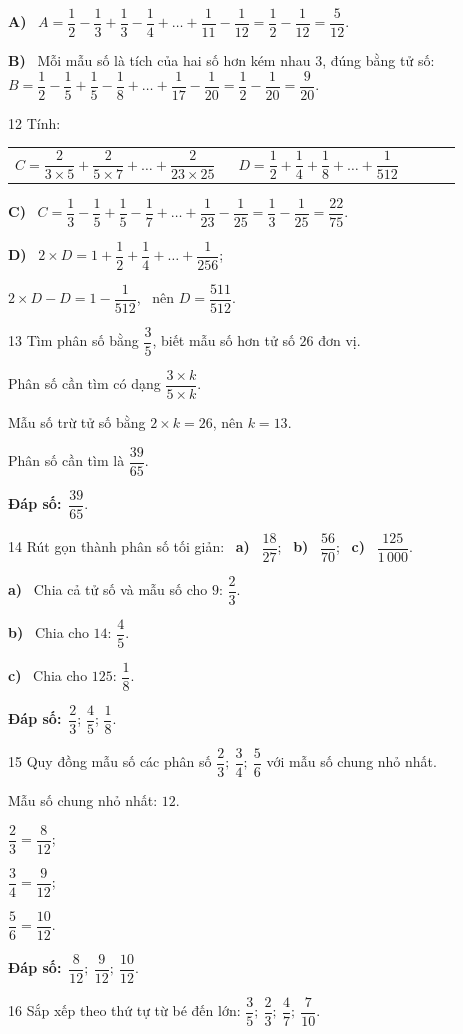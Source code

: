 \documentclass[11pt]{article}
\makeatletter
\newif\ifsol \solfalse
\renewcommand{\arraystretch}{1.35}
\providecommand{\AnsWord}{Đáp số}
\newcommand{\dapso}[1]{\par\textbf{\AnsWord:}\ #1}
\newcommand{\probsol}[1]{%
  \begin{lrbox}{\solmeasure}\begin{minipage}{\dimexpr\linewidth-24pt\relax}#1\end{minipage}\end{lrbox}%
  \ifsol
    \begin{solbox}#1\end{solbox}%
  \else
    \setlength{\solht}{\dimexpr\ht\solmeasure+\dp\solmeasure+0.85cm\relax}%
    \ifdim\solht<1.35cm\setlength{\solht}{1.35cm}\fi
    \begin{tcolorbox}[colback=white,colframe=Line,boxrule=0.8pt,arc=5pt,
      left=8pt,right=8pt,top=4pt,bottom=4pt,height=\solht]{\footnotesize\color{Slate}\itshape\WorkWord}\end{tcolorbox}%
  \fi}
\newcommand{\pa}[1]{\textbf{#1)}\ }
\newenvironment{cols2}{\par\vspace{3pt}\noindent\setlength{\tabcolsep}{0pt}\renewcommand{\arraystretch}{1.3}%
  \begin{tabular}{@{}>{\raggedright\arraybackslash\rule{0pt}{4.4ex}}p{0.48\linewidth}<{\rule[-2.3ex]{0pt}{0pt}}@{\hspace{0.03\linewidth}}>{\raggedright\arraybackslash\rule{0pt}{4.4ex}}p{0.48\linewidth}<{\rule[-2.3ex]{0pt}{0pt}}@{}}}%
  {\end{tabular}\par}
\newcommand{\gap}{\vspace{0.3cm}}
\def\WorkWord{Bài làm:}
\def\AnsWord{Đáp số}
\makeatother
\begin{document}
\probsol{
\pa{A} $A=\dfrac12-\dfrac13+\dfrac13-\dfrac14+\dots+\dfrac1{11}-\dfrac1{12}=\dfrac12-\dfrac1{12}=\dfrac5{12}$.\par
\pa{B} Mỗi mẫu số là tích của hai số hơn kém nhau $3$, đúng bằng tử số: $B=\dfrac12-\dfrac15+\dfrac15-\dfrac18+\dots+\dfrac1{17}-\dfrac1{20}=\dfrac12-\dfrac1{20}=\dfrac9{20}$.
}
\gap
\begin{probbox}{12}{\relax}
Tính:
\begin{cols2}
$C=\dfrac2{3\times5}+\dfrac2{5\times7}+\dots+\dfrac2{23\times25}$ & $D=\dfrac12+\dfrac14+\dfrac18+\dots+\dfrac1{512}$
\end{cols2}
\end{probbox}
\probsol{
\pa{C} $C=\dfrac13-\dfrac15+\dfrac15-\dfrac17+\dots+\dfrac1{23}-\dfrac1{25}=\dfrac13-\dfrac1{25}=\dfrac{22}{75}$.\par
\pa{D} $2\times D=1+\dfrac12+\dfrac14+\dots+\dfrac1{256}$;\par $2\times D-D=1-\dfrac1{512}$, \ nên $D=\dfrac{511}{512}$.
}
\gap
\begin{probbox}{13}{\relax}
Tìm phân số bằng $\dfrac35$, biết mẫu số hơn tử số $26$ đơn vị.
\end{probbox}
\probsol{
Phân số cần tìm có dạng $\dfrac{3\times k}{5\times k}$.\par Mẫu số trừ tử số bằng $2\times k=26$, nên $k=13$.\par
Phân số cần tìm là $\dfrac{39}{65}$.
\dapso{$\dfrac{39}{65}$.}}
\gap
\begin{probbox}{14}{\relax}
Rút gọn thành phân số tối giản: \ \pa{a} $\dfrac{18}{27}$; \ \pa{b} $\dfrac{56}{70}$; \ \pa{c} $\dfrac{125}{1\,000}$.
\end{probbox}
\probsol{
\pa{a} Chia cả tử số và mẫu số cho $9$: $\dfrac23$.\par \pa{b} Chia cho $14$: $\dfrac45$.\par \pa{c} Chia cho $125$: $\dfrac18$.
\dapso{$\dfrac23$; $\dfrac45$; $\dfrac18$.}}
\gap
\begin{probbox}{15}{\relax}
Quy đồng mẫu số các phân số $\dfrac23;\ \dfrac34;\ \dfrac56$ với mẫu số chung nhỏ nhất.
\end{probbox}
\probsol{
Mẫu số chung nhỏ nhất: $12$.\par $\dfrac23=\dfrac8{12}$;\par $\dfrac34=\dfrac9{12}$;\par $\dfrac56=\dfrac{10}{12}$.
\dapso{$\dfrac8{12};\ \dfrac9{12};\ \dfrac{10}{12}$.}}
\gap
\begin{probbox}{16}{\relax}
Sắp xếp theo thứ tự từ bé đến lớn: $\dfrac35;\ \dfrac23;\ \dfrac47;\ \dfrac7{10}$.
\end{probbox}
\end{document}
